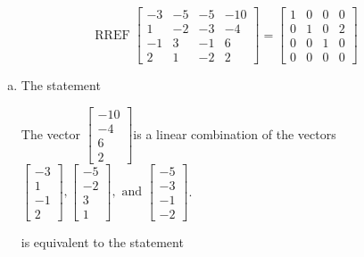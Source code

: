 \begin{exerciseAnswer} 
\[\operatorname{RREF}  \left[\begin{array}{ccc|c}
-3 & -5 & -5 & -10 \\
1 & -2 & -3 & -4 \\
-1 & 3 & -1 & 6 \\
2 & 1 & -2 & 2
\end{array}\right] = \left[\begin{array}{ccc|c}
1 & 0 & 0 & 0 \\
0 & 1 & 0 & 2 \\
0 & 0 & 1 & 0 \\
0 & 0 & 0 & 0
\end{array}\right] \]
\begin{enumerate}[(a)]
\item  The statement 
\begin{center}\begin{minipage}{0.8\textwidth}
 The vector \( \left[\begin{array}{c}
-10 \\
-4 \\
6 \\
2
\end{array}\right] \)is a linear combination of the vectors \( \left[\begin{array}{c}
-3 \\
1 \\
-1 \\
2
\end{array}\right] , \left[\begin{array}{c}
-5 \\
-2 \\
3 \\
1
\end{array}\right] , \text{ and } \left[\begin{array}{c}
-5 \\
-3 \\
-1 \\
-2
\end{array}\right] \). 
\end{minipage}\end{center}
     is equivalent to the statement 
\begin{center}\begin{minipage}{0.8\textwidth}
 The vector equation \( x_{1} \left[\begin{array}{c}
-3 \\
1 \\
-1 \\

\end{array}
\end{minipage}
\end{center}
\end{enumerate}
\end{exerciseAnswer}

